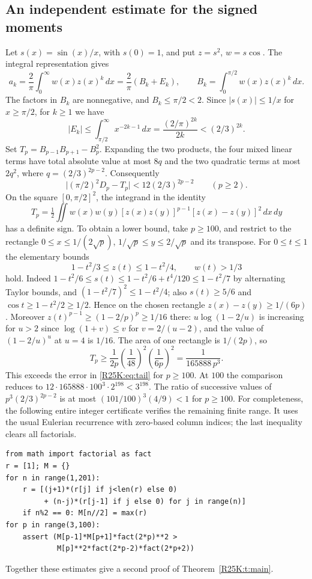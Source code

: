 \documentclass[11pt,a4paper]{article}
\begin{document}
\subsection{An independent estimate for the signed moments}
Let $s(x)=\sin(x)/x$, with $s(0)=1$, and put $z=s^2$,
$w=s\cos$. The integral representation \cite[(1.1), (4.7)]{R25K:AG} gives
\[
 a_k=\frac2\pi\int_0^\infty w(x)z(x)^k\,dx
 =\frac2\pi(B_k+E_k),\qquad
 B_k=\int_0^{\pi/2} w(x)z(x)^k\,dx .
\]
The factors in $B_k$ are nonnegative, and $B_k\le\pi/2<2$.
Since $|s(x)|\le1/x$ for $x\ge\pi/2$, for $k\ge1$ we have
\[
 |E_k|\le \int_{\pi/2}^\infty x^{-2k-1}\,dx
 =\frac{(2/\pi)^{2k}}{2k}<(2/3)^{2k}.
\]
Set $T_p=B_{p-1}B_{p+1}-B_p^2$. Expanding the two products, the
four mixed linear terms have total absolute value at most $8q$
and the two quadratic terms at most $2q^2$, where
$q=(2/3)^{2p-2}$. Consequently
\begin{equation}\label{R25K:eq:tail}
 \big|(\pi/2)^2D_p-T_p\big|<12(2/3)^{2p-2}\qquad (p\ge2).
\end{equation}
On the square $[0,\pi/2]^2$, the integrand in the identity
\[
 T_p=\tfrac12\iint w(x)w(y)[z(x)z(y)]^{p-1}
                  [z(x)-z(y)]^2\,dx\,dy
\]
has a definite sign. To obtain a lower bound, take $p\ge100$, and
restrict to the rectangle $0\le x\le 1/(2\sqrt p)$,
$1/\sqrt p\le y\le2/\sqrt p$ and its transpose.
For $0\le t\le1$ the elementary bounds
\[
 1-t^2/3\le z(t)\le 1-t^2/4,\qquad w(t)>1/3
\]
hold. Indeed $1-t^2/6\le s(t)\le1-t^2/6+t^4/120
\le1-t^2/7$ by alternating Taylor bounds, and
$(1-t^2/7)^2\le1-t^2/4$; also $s(t)\ge5/6$ and
$\cos t\ge 1-t^2/2\ge1/2$. Hence on the chosen rectangle
$z(x)-z(y)\ge 1/(6p)$. Moreover $z(t)^{p-1}\ge
(1-2/p)^p\ge 1/16$ there: $u\log(1-2/u)$ is increasing for
$u>2$ since $\log(1+v)\le v$ for $v=2/(u-2)$, and the
value of $(1-2/u)^u$ at $u=4$ is $1/16$.
The area of one rectangle is $1/(2p)$, so
\[
 T_p\ge \frac{1}{2p}\left(\frac{1}{48}\right)^2
                   \left(\frac{1}{6p}\right)^2
     = \frac1{165888\,p^3}.
\]
This exceeds the error in \eqref{R25K:eq:tail} for $p\ge100$.
At $100$ the comparison reduces to
$12\cdot165888\cdot100^3\cdot 2^{198}<3^{198}$.
The ratio of successive values of $p^3(2/3)^{2p-2}$ is at most
$(101/100)^3(4/9)<1$ for $p\ge100$.
For completeness, the following entire integer certificate verifies the
remaining finite range. It uses the usual Eulerian recurrence with
zero-based column indices; the last inequality clears all factorials.
\begin{Verbatim}[fontsize=\footnotesize,breaklines,breakanywhere]
from math import factorial as fact
r = [1]; M = {}
for n in range(1,201):
    r = [(j+1)*(r[j] if j<len(r) else 0)
         + (n-j)*(r[j-1] if j else 0) for j in range(n)]
    if n%2 == 0: M[n//2] = max(r)
for p in range(3,100):
    assert (M[p-1]*M[p+1]*fact(2*p)**2 >
            M[p]**2*fact(2*p-2)*fact(2*p+2))
\end{Verbatim}
Together these estimates give a second proof of Theorem~\ref{R25K:t:main}.
\end{document}
